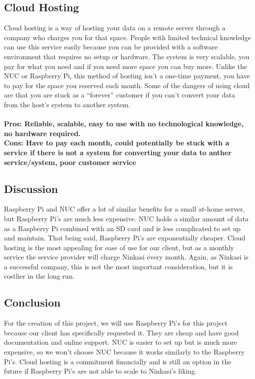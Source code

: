 \documentclass[draftclsnofoot,onecolumn,letterpaper,10pt,compsoc]{IEEEtran}
\begin{document}
			\subsection{Cloud Hosting}
		        Cloud hosting is a way of hosting your data on a remote server through a company who charges you for that space.
						People with limited technical knowledge can use this service easily because you can be provided with a software environment that requires no setup or hardware\cite{InterRoute}.
						The system is very scalable, you pay for what you need and if you need more space you can buy more\cite{InterRoute}.
						Unlike the NUC or Raspberry Pi, this method of hosting isn't a one-time payment, you have to pay for the space you reserved each month\cite{TheBalance}.
						Some of the dangers of using cloud are that you are stuck as a “forever” customer if you can't convert your data from the host's system to another system\cite{TheBalance}.
						\\ \\
						\textbf{Pros: Reliable, scalable, easy to use with no technological knowledge, no hardware required.}
						\\
						\textbf{Cons: Have to pay each month, could potentially be stuck with a service if there is not a system for converting your data to anther service/system, poor customer service}


					\subsection{Discussion}
						Raspberry Pi and NUC offer a lot of similar benefits for a small at-home server, but Raspberry Pi’s are much less expensive.
						NUC holds a similar amount of data as a Raspberry Pi combined with an SD card and is less complicated to set up and maintain.
						That being said, Raspberry Pi's are exponentially cheaper.
						Cloud hosting is the most appealing for ease of use for our client, but as a monthly service the service provider will charge Ninkasi every month.
						Again, as Ninkasi is a successful company, this is not the most important consideration, but it is costlier in the long run.

						\subsection{Conclusion}
						For the creation of this project, we will use Raspberry Pi’s for this project because our client has specifically requested it.
						They are cheap and have good documentation and online support.
						NUC is easier to set up but is much more expensive, so we won’t choose NUC because it works similarly to the Raspberry Pi’s.
						Cloud hosting is a commitment financially and is still an option in the future if Raspberry Pi’s are not able to scale to Ninkasi’s liking.
\end{document}
